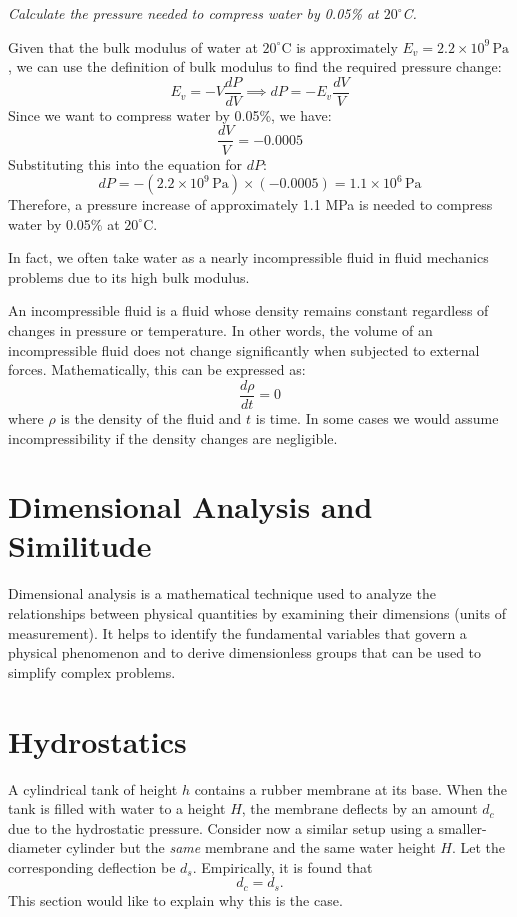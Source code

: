 \documentclass[11pt]{report}
\begin{document}
\begin{example}
    \textit{Calculate the pressure needed to compress water by 0.05\% at $20^\circ$C.}

    Given that the bulk modulus of water at $20^\circ$C is approximately \(E_v = 2.2 \times 10^9 \, \text{Pa}\), we can use the definition of bulk modulus to find the required pressure change:
    \[E_v = -V \frac{dP}{dV} \implies dP = -E_v \frac{dV}{V}\]
    Since we want to compress water by 0.05\%, we have:
    \[\frac{dV}{V} = -0.0005\]
    Substituting this into the equation for \(dP\):
    \[dP = - (2.2 \times 10^9 \,\text{Pa}) \times (-0.0005) = 1.1 \times 10^6 \, \text{Pa}\]
    Therefore, a pressure increase of approximately 1.1 MPa is needed to compress water by 0.05\% at $20^\circ$C.
\end{example}
In fact, we often take water as a nearly incompressible fluid in fluid mechanics problems due to its high bulk modulus.

\begin{definition}
    An incompressible fluid is a fluid whose density remains constant regardless of changes in pressure or temperature. In other words, the volume of an incompressible fluid does not change significantly when subjected to external forces. Mathematically, this can be expressed as:
    $$
        \frac{d\rho}{dt} = 0
    $$
    where \(\rho\) is the density of the fluid and \(t\) is time. In some cases we would assume incompressibility if the density changes are negligible.
    
\end{definition}

\section{Dimensional Analysis and Similitude}
\begin{definition}
    Dimensional analysis is a mathematical technique used to analyze the relationships between physical quantities by examining their dimensions (units of measurement). It helps to identify the fundamental variables that govern a physical phenomenon and to derive dimensionless groups that can be used to simplify complex problems.
\end{definition}


\section{Hydrostatics}
\begin{example}
    A cylindrical tank of height \(h\) contains a rubber membrane at its base. When the tank is filled with water to a height \(H\), the membrane deflects by an amount \(d_c\) due to the hydrostatic pressure. Consider now a similar setup using a smaller-diameter cylinder but the \emph{same} membrane and the same water height \(H\). Let the corresponding deflection be \(d_s\). Empirically, it is found that
    \[
    d_c = d_s.
    \] 
    This section would like to explain why this is the case.
\end{example}
\end{document}
